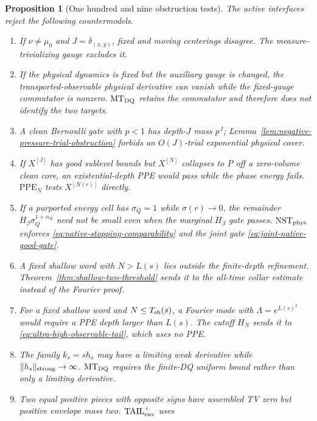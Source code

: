 \documentclass[11pt]{article}
\newtheorem{proposition}[theorem]{Proposition}
\begin{document}
\begin{proposition}[One hundred and nine obstruction tests]
\label{prop:v47-obstruction-tests}
The active interfaces reject the following countermodels.
\begin{enumerate}[label=\textup{(T\arabic*)}]
\item If $\nu\ne\mu_0$ and $J=\delta_{(x,y)}$, fixed and moving
      centerings disagree.  The measure-trivializing gauge excludes it.
\item If the physical dynamics is fixed but the auxiliary gauge is changed,
      the transported-observable physical derivative can vanish while the
      fixed-gauge commutator is nonzero.  $\mathrm{MT}_{\rm DQ}$ retains the
      commutator and therefore does not identify the two targets.
\item A clean Bernoulli gate with $p<1$ has depth-$J$ mass $p^J$;
      Lemma~\ref{lem:negative-pressure-trial-obstruction} forbids an
      $O(J)$-trial exponential physical cover.
\item If $X^{[J]}$ has good sublevel bounds but $X^{[N]}$ collapses to $P$
      off a zero-volume clean core, an existential-depth PPE would pass while
      the phase energy fails.  $\mathrm{PPE}_{N}$ tests $X^{[N(r)]}$
      directly.
\item If a purported energy cell has $\sigma_Q=1$ while
      $\sigma(r)\to0$, the remainder
      $H_\beta\sigma_Q^{1+\alpha_B}$ need not be small even when the
      marginal $H_\beta$ gate passes.  $\mathrm{NST}_{\rm phys}$ enforces
      \eqref{eq:native-stopping-comparability} and the joint gate
      \eqref{eq:joint-native-good-gate}.
\item A fixed shallow word with $N>L(s)$ lies outside the finite-depth
      refinement.  Theorem~\ref{thm:shallow-two-threshold} sends it to the
      all-time collar estimate instead of the Fourier proof.
\item For a fixed shallow word and $N\le T_{\rm sh}(s)$, a Fourier mode with
      $\Lambda=e^{L(s)^2}$ would require a PPE depth larger than $L(s)$.
      The cutoff $H_N$ sends it to
      \eqref{eq:ultra-high-observable-tail}, which uses no PPE.
\item The family $k_s=s h_s$ may have a limiting weak derivative while
      $\|h_s\|_{\rm strong}\to\infty$.  $\mathrm{MT}_{\rm DQ}$
      requires the finite-DQ uniform bound rather than only a limiting
      derivative.
\item Two equal positive pieces with opposite signs have assembled TV zero
      but positive envelope mass two.  $\mathrm{TAIL}_{\rm env}^{+}$ uses

\end{enumerate}
\end{proposition}
\end{document}
